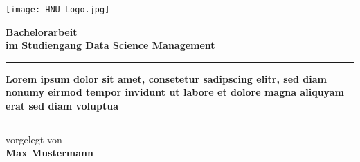 \documentclass[12pt, a4paper, twoside]{article} %
\newcommand*{\getStudyCourse}{Data Science Management}
\newcommand*{\getThesisType}{Bachelorarbeit}
\newcommand*{\getTitle}{Lorem ipsum dolor sit amet, consetetur sadipscing elitr, sed diam nonumy eirmod tempor invidunt ut labore et dolore magna aliquyam erat sed diam voluptua}
\newcommand*{\getAuthor}{Max Mustermann}
\begin{document}

\begin{titlepage}
    \begin{center}
        \vspace*{\fill} %

        \begin{minipage}{\textwidth}
            \centering

            \texttt{[image: HNU\_Logo.jpg]} 
            \vspace*{1cm}

            \begin{minipage}{0.6\textwidth}
                \centering
                \Large \textbf{\getThesisType} \\
                \vspace{0.5cm}
                \large \textbf{im Studiengang \getStudyCourse} \\
                \vspace{0.5cm}
                \vspace{0.2cm}
                \hrule %
                \vspace{0.2cm}
                \Large \textbf{\getTitle} \\
                \vspace{0.2cm}
                \hrule %
                \vspace{0.5cm}
                \normalsize vorgelegt von \\
                \textbf{\getAuthor} \\
            \end{minipage}

            \vspace*{1cm}


\end{minipage}
\end{center}
\end{titlepage}
\end{document}
